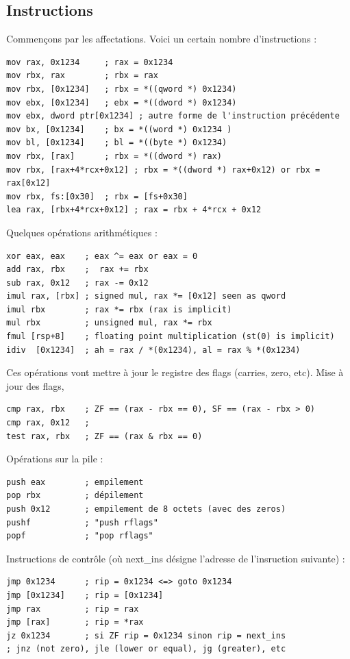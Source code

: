\documentclass{book}
\begin{document}
\subsection{Instructions}
Commençons par les affectations. Voici un certain nombre d'instructions :  
\begin{verbatim}
mov rax, 0x1234     ; rax = 0x1234
mov rbx, rax        ; rbx = rax
mov rbx, [0x1234]   ; rbx = *((qword *) 0x1234)
mov ebx, [0x1234]   ; ebx = *((dword *) 0x1234) 
mov ebx, dword ptr[0x1234] ; autre forme de l'instruction précédente
mov bx, [0x1234]    ; bx = *((word *) 0x1234 )
mov bl, [0x1234]    ; bl = *((byte *) 0x1234)
mov rbx, [rax]      ; rbx = *((dword *) rax)
mov rbx, [rax+4*rcx+0x12] ; rbx = *((dword *) rax+0x12) or rbx = rax[0x12]
mov rbx, fs:[0x30]  ; rbx = [fs+0x30]
lea rax, [rbx+4*rcx+0x12] ; rax = rbx + 4*rcx + 0x12
\end{verbatim}

Quelques opérations arithmétiques : 
\begin{verbatim}
xor eax, eax    ; eax ^= eax or eax = 0
add rax, rbx    ;  rax += rbx
sub rax, 0x12   ; rax -= 0x12
imul rax, [rbx] ; signed mul, rax *= [0x12] seen as qword 
imul rbx        ; rax *= rbx (rax is implicit) 
mul rbx         ; unsigned mul, rax *= rbx 
fmul [rsp+8]    ; floating point multiplication (st(0) is implicit)
idiv  [0x1234]  ; ah = rax / *(0x1234), al = rax % *(0x1234)
\end{verbatim}
Ces opérations vont mettre à jour le registre des flags (carries, zero, etc). Mise à jour des flags,
\begin{verbatim}
cmp rax, rbx    ; ZF == (rax - rbx == 0), SF == (rax - rbx > 0)
cmp rax, 0x12   ; 
test rax, rbx   ; ZF == (rax & rbx == 0)
\end{verbatim}


Opérations sur la pile : 
\begin{verbatim}
push eax        ; empilement
pop rbx         ; dépilement
push 0x12       ; empilement de 8 octets (avec des zeros)
pushf           ; "push rflags"
popf            ; "pop rflags"  
\end{verbatim}

Instructions de contrôle (où next\_ins désigne l'adresse de l'insruction suivante) : 
\begin{verbatim}
jmp 0x1234      ; rip = 0x1234 <=> goto 0x1234
jmp [0x1234]    ; rip = [0x1234]
jmp rax         ; rip = rax
jmp [rax]       ; rip = *rax
jz 0x1234       ; si ZF rip = 0x1234 sinon rip = next_ins
; jnz (not zero), jle (lower or equal), jg (greater), etc
\end{verbatim}
\end{document}
